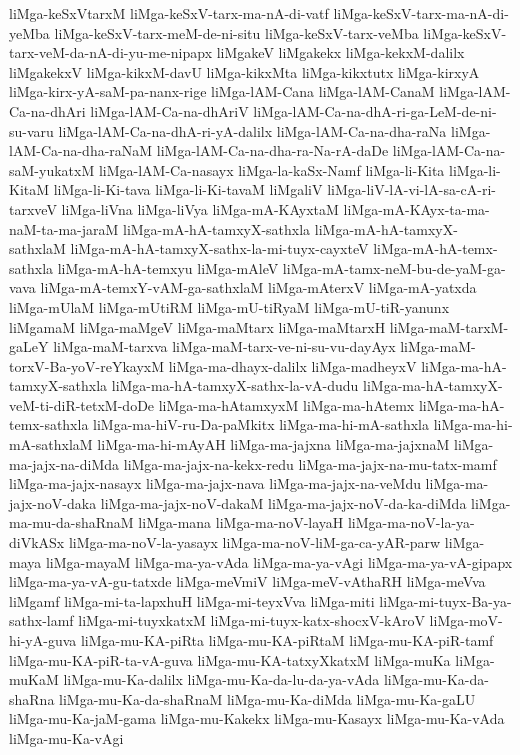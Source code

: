 {liMga-keSxVtarxM
liMga-keSxV-tarx-ma-nA-di-vatf
liMga-keSxV-tarx-ma-nA-di-yeMba
liMga-keSxV-tarx-meM-de-ni-situ
liMga-keSxV-tarx-veMba
liMga-keSxV-tarx-veM-da-nA-di-yu-me-nipapx
liMgakeV
liMgakekx
liMga-kekxM-dalilx
liMgakekxV
liMga-kikxM-davU
liMga-kikxMta
liMga-kikxtutx
liMga-kirxyA
liMga-kirx-yA-saM-pa-nanx-rige
liMga-lAM-Cana
liMga-lAM-CanaM
liMga-lAM-Ca-na-dhAri
liMga-lAM-Ca-na-dhAriV
liMga-lAM-Ca-na-dhA-ri-ga-LeM-de-ni-su-varu
liMga-lAM-Ca-na-dhA-ri-yA-dalilx
liMga-lAM-Ca-na-dha-raNa
liMga-lAM-Ca-na-dha-raNaM
liMga-lAM-Ca-na-dha-ra-Na-rA-daDe
liMga-lAM-Ca-na-saM-yukatxM
liMga-lAM-Ca-nasayx
liMga-la-kaSx-Namf
liMga-li-Kita
liMga-li-KitaM
liMga-li-Ki-tava
liMga-li-Ki-tavaM
liMgaliV
liMga-liV-lA-vi-lA-sa-cA-ri-tarxveV
liMga-liVna
liMga-liVya
liMga-mA-KAyxtaM
liMga-mA-KAyx-ta-ma-naM-ta-ma-jaraM
liMga-mA-hA-tamxyX-sathxla
liMga-mA-hA-tamxyX-sathxlaM
liMga-mA-hA-tamxyX-sathx-la-mi-tuyx-cayxteV
liMga-mA-hA-temx-sathxla
liMga-mA-hA-temxyu
liMga-mAleV
liMga-mA-tamx-neM-bu-de-yaM-ga-vava
liMga-mA-temxY-vAM-ga-sathxlaM
liMga-mAterxV
liMga-mA-yatxda
liMga-mUlaM
liMga-mUtiRM
liMga-mU-tiRyaM
liMga-mU-tiR-yanunx
liMgamaM
liMga-maMgeV
liMga-maMtarx
liMga-maMtarxH
liMga-maM-tarxM-gaLeY
liMga-maM-tarxva
liMga-maM-tarx-ve-ni-su-vu-dayAyx
liMga-maM-torxV-Ba-yoV-reYkayxM
liMga-ma-dhayx-dalilx
liMga-madheyxV
liMga-ma-hA-tamxyX-sathxla
liMga-ma-hA-tamxyX-sathx-la-vA-dudu
liMga-ma-hA-tamxyX-veM-ti-diR-tetxM-doDe
liMga-ma-hAtamxyxM
liMga-ma-hAtemx
liMga-ma-hA-temx-sathxla
liMga-ma-hiV-ru-Da-paMkitx
liMga-ma-hi-mA-sathxla
liMga-ma-hi-mA-sathxlaM
liMga-ma-hi-mAyAH
liMga-ma-jajxna
liMga-ma-jajxnaM
liMga-ma-jajx-na-diMda
liMga-ma-jajx-na-kekx-redu
liMga-ma-jajx-na-mu-tatx-mamf
liMga-ma-jajx-nasayx
liMga-ma-jajx-nava
liMga-ma-jajx-na-veMdu
liMga-ma-jajx-noV-daka
liMga-ma-jajx-noV-dakaM
liMga-ma-jajx-noV-da-ka-diMda
liMga-ma-mu-da-shaRnaM
liMga-mana
liMga-ma-noV-layaH
liMga-ma-noV-la-ya-diVkASx
liMga-ma-noV-la-yasayx
liMga-ma-noV-liM-ga-ca-yAR-parw
liMga-maya
liMga-mayaM
liMga-ma-ya-vAda
liMga-ma-ya-vAgi
liMga-ma-ya-vA-gipapx
liMga-ma-ya-vA-gu-tatxde
liMga-meVmiV
liMga-meV-vAthaRH
liMga-meVva
liMgamf
liMga-mi-ta-lapxhuH
liMga-mi-teyxVva
liMga-miti
liMga-mi-tuyx-Ba-ya-sathx-lamf
liMga-mi-tuyxkatxM
liMga-mi-tuyx-katx-shocxV-kAroV
liMga-moV-hi-yA-guva
liMga-mu-KA-piRta
liMga-mu-KA-piRtaM
liMga-mu-KA-piR-tamf
liMga-mu-KA-piR-ta-vA-guva
liMga-mu-KA-tatxyXkatxM
liMga-muKa
liMga-muKaM
liMga-mu-Ka-dalilx
liMga-mu-Ka-da-lu-da-ya-vAda
liMga-mu-Ka-da-shaRna
liMga-mu-Ka-da-shaRnaM
liMga-mu-Ka-diMda
liMga-mu-Ka-gaLU
liMga-mu-Ka-jaM-gama
liMga-mu-Kakekx
liMga-mu-Kasayx
liMga-mu-Ka-vAda
liMga-mu-Ka-vAgi
}
